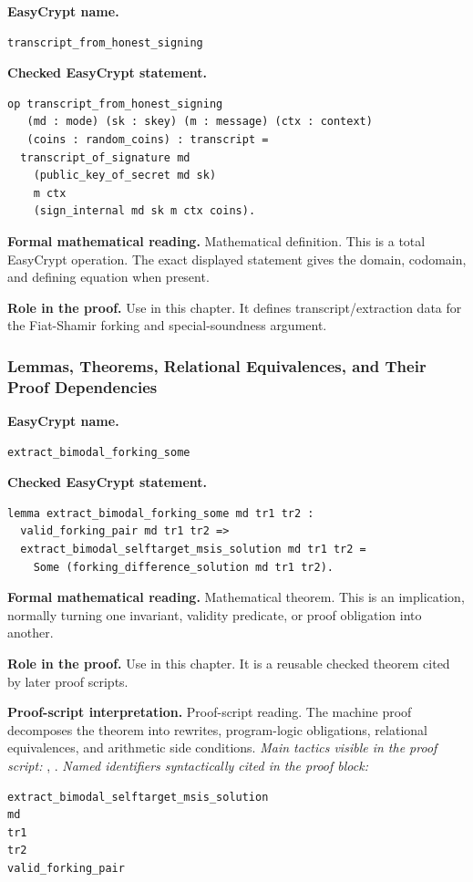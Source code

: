 \begin{formaldefinition}
\noindent\textbf{EasyCrypt name.}
\begin{lstlisting}[language=EasyCrypt,basicstyle=\ttfamily\scriptsize]
transcript_from_honest_signing
\end{lstlisting}
\noindent\textbf{Checked EasyCrypt statement.}
\begin{lstlisting}[language=EasyCrypt,basicstyle=\ttfamily\scriptsize]
op transcript_from_honest_signing
   (md : mode) (sk : skey) (m : message) (ctx : context)
   (coins : random_coins) : transcript =
  transcript_of_signature md
    (public_key_of_secret md sk)
    m ctx
    (sign_internal md sk m ctx coins).
\end{lstlisting}
\noindent\textbf{Formal mathematical reading.}
Mathematical definition. This is a total EasyCrypt operation.  The exact displayed statement gives the domain, codomain, and defining equation when present.

\noindent\textbf{Role in the proof.}
Use in this chapter. It defines transcript/extraction data for the Fiat-Shamir forking and special-soundness argument.

\end{formaldefinition}

\subsubsection*{Lemmas, Theorems, Relational Equivalences, and Their Proof Dependencies}
\begin{formaltheorem}
\noindent\textbf{EasyCrypt name.}
\begin{lstlisting}[language=EasyCrypt,basicstyle=\ttfamily\scriptsize]
extract_bimodal_forking_some
\end{lstlisting}
\noindent\textbf{Checked EasyCrypt statement.}
\begin{lstlisting}[language=EasyCrypt,basicstyle=\ttfamily\scriptsize]
lemma extract_bimodal_forking_some md tr1 tr2 :
  valid_forking_pair md tr1 tr2 =>
  extract_bimodal_selftarget_msis_solution md tr1 tr2 =
    Some (forking_difference_solution md tr1 tr2).
\end{lstlisting}
\noindent\textbf{Formal mathematical reading.}
Mathematical theorem. This is an implication, normally turning one invariant, validity predicate, or proof obligation into another.

\noindent\textbf{Role in the proof.}
Use in this chapter. It is a reusable checked theorem cited by later proof scripts.

\noindent\textbf{Proof-script interpretation.}
Proof-script reading. The machine proof decomposes the theorem into rewrites, program-logic obligations, relational equivalences, and arithmetic side conditions.
\emph{Main tactics visible in the proof script:} , .
\emph{Named identifiers syntactically cited in the proof block:}
\begin{lstlisting}[language=EasyCrypt,basicstyle=\ttfamily\scriptsize]
extract_bimodal_selftarget_msis_solution
md
tr1
tr2
valid_forking_pair
\end{lstlisting}

\end{formaltheorem}

